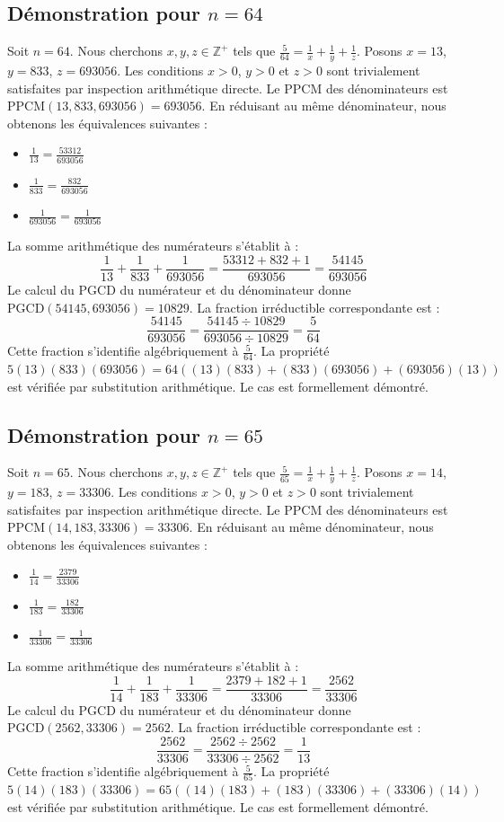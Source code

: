 \documentclass[12pt,a4paper]{article}
\begin{document}
\subsection{Démonstration pour $n = 64$}
Soit $n = 64$. Nous cherchons $x, y, z \in \mathbb{Z}^{+}$ tels que $\frac{5}{64} = \frac{1}{x} + \frac{1}{y} + \frac{1}{z}$.
Posons $x = 13$, $y = 833$, $z = 693056$.
Les conditions $x > 0$, $y > 0$ et $z > 0$ sont trivialement satisfaites par inspection arithmétique directe.
Le PPCM des dénominateurs est $\text{PPCM}(13, 833, 693056) = 693056$.
En réduisant au même dénominateur, nous obtenons les équivalences suivantes :
\begin{itemize}
    \item $\frac{1}{13} = \frac{53312}{693056}$
    \item $\frac{1}{833} = \frac{832}{693056}$
    \item $\frac{1}{693056} = \frac{1}{693056}$
\end{itemize}
La somme arithmétique des numérateurs s'établit à :
$$ \frac{1}{13} + \frac{1}{833} + \frac{1}{693056} = \frac{53312 + 832 + 1}{693056} = \frac{54145}{693056} $$
Le calcul du PGCD du numérateur et du dénominateur donne $\text{PGCD}(54145, 693056) = 10829$.
La fraction irréductible correspondante est :
$$ \frac{54145}{693056} = \frac{54145 \div 10829}{693056 \div 10829} = \frac{5}{64} $$
Cette fraction s'identifie algébriquement à $\frac{5}{64}$.
La propriété $5(13)(833)(693056) = 64((13)(833) + (833)(693056) + (693056)(13))$ est vérifiée par substitution arithmétique.
Le cas est formellement démontré.

\subsection{Démonstration pour $n = 65$}
Soit $n = 65$. Nous cherchons $x, y, z \in \mathbb{Z}^{+}$ tels que $\frac{5}{65} = \frac{1}{x} + \frac{1}{y} + \frac{1}{z}$.
Posons $x = 14$, $y = 183$, $z = 33306$.
Les conditions $x > 0$, $y > 0$ et $z > 0$ sont trivialement satisfaites par inspection arithmétique directe.
Le PPCM des dénominateurs est $\text{PPCM}(14, 183, 33306) = 33306$.
En réduisant au même dénominateur, nous obtenons les équivalences suivantes :
\begin{itemize}
    \item $\frac{1}{14} = \frac{2379}{33306}$
    \item $\frac{1}{183} = \frac{182}{33306}$
    \item $\frac{1}{33306} = \frac{1}{33306}$
\end{itemize}
La somme arithmétique des numérateurs s'établit à :
$$ \frac{1}{14} + \frac{1}{183} + \frac{1}{33306} = \frac{2379 + 182 + 1}{33306} = \frac{2562}{33306} $$
Le calcul du PGCD du numérateur et du dénominateur donne $\text{PGCD}(2562, 33306) = 2562$.
La fraction irréductible correspondante est :
$$ \frac{2562}{33306} = \frac{2562 \div 2562}{33306 \div 2562} = \frac{1}{13} $$
Cette fraction s'identifie algébriquement à $\frac{5}{65}$.
La propriété $5(14)(183)(33306) = 65((14)(183) + (183)(33306) + (33306)(14))$ est vérifiée par substitution arithmétique.
Le cas est formellement démontré.
\end{document}
